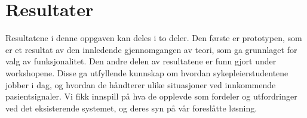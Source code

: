 \chapter{Resultater}
\label{chp:resultater}

Resultatene i denne oppgaven kan deles i to deler. Den første er prototypen, som er et resultat av den innledende gjennomgangen av teori, som ga grunnlaget for valg av funksjonalitet. Den andre delen av resultatene er funn gjort under workshopene. Disse ga utfyllende kunnskap om hvordan sykepleierstudentene jobber i dag, og hvordan de håndterer ulike situasjoner ved innkommende pasientsignaler. Vi fikk innspill på hva de opplevde som fordeler og utfordringer ved det eksisterende systemet, og deres syn på vår foreslåtte løsning. 